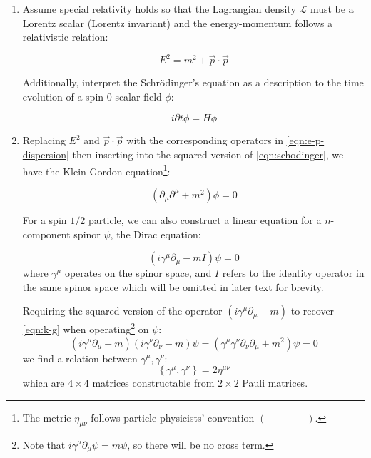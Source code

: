 \begin{enumerate}
    \item Assume special relativity holds so that the Lagrangian density
        $\mathcal{L}$
        must be a Lorentz scalar (Lorentz invariant) and the
        energy-momentum follows a relativistic relation:

        \begin{equation}
            E^2 = m^2 + \vec{p} \cdot \vec{p}
            \label{eqn:e-p-dispersion}
        \end{equation}

        Additionally,
        interpret the Schrödinger's equation as a description to the time
        evolution of a spin-0 scalar field $\phi$:

        \begin{equation}
            i \partial t \phi = H \phi
            \label{eqn:schodinger}
        \end{equation}

    \item Replacing $E^2$ and $\vec{p} \cdot \vec{p}$
        with the corresponding operators in
        \cref{eqn:e-p-dispersion}
        then inserting into the squared version of
        \cref{eqn:schodinger},
        we have the Klein-Gordon equation\footnote{
            The metric $\eta_{\mu\nu}$ follows particle physicists' convention
            $(+ - - -)$.
        }:

        \begin{equation}
            (\partial_\mu \partial^\mu + m^2) \phi = 0
            \label{eqn:k-g}
        \end{equation}

        For a spin $1/2$ particle,
        we can also construct a linear equation for a $n$-component spinor
        $\psi$, the Dirac equation:

        \begin{equation}
            (i \gamma^\mu \partial_\mu - m I) \psi = 0
            \label{eqn:dirac}
        \end{equation}
        where $\gamma^\mu$ operates on the spinor space, and $I$ refers to the
        identity operator in the same spinor space which will be omitted in
        later text for brevity.

        Requiring the squared version of the operator
        $(i \gamma^\mu \partial_\mu - m)$ to recover \cref{eqn:k-g} when
        operating\footnote{
            Note that $i \gamma^\mu \partial_\mu \psi = m \psi$,
            so there will be no cross term.
        } on $\psi$:
        \begin{equation}
            (i \gamma^\mu \partial_\mu - m)
            (i \gamma^\nu \partial_\nu - m) \psi =
            (\gamma^\mu\gamma^\nu \partial_\nu \partial_\mu + m^2) \psi = 0
        \end{equation}
        we find a relation between $\gamma^\mu, \gamma^\nu$:
        \begin{equation}
            \left\{ \gamma^\mu, \gamma^\nu \right\} = 2 \eta^{\mu\nu}
        \end{equation}
        which are $4 \times 4$ matrices constructable from $2 \times 2$ Pauli
        matrices.



\end{enumerate}
